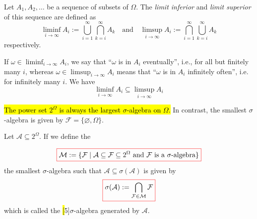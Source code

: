 \begin{definition}\label{def:liminf-limsup-sets}
Let $A_1,A_2,\dots$ be a sequence of subsets of $\Omega$.
The \emph{limit inferior} and \emph{limit superior} of this sequence are defined as
\[
  \liminf_{i\to\infty} A_i := \bigcup_{i=1}^{\infty} \bigcap_{k=i}^{\infty} A_k
\quad\text{and}\quad
  \limsup_{i\to\infty} A_i := \bigcap_{i=1}^{\infty} \bigcup_{k=i}^{\infty} A_k
\]
respectively.
\end{definition}

If $\omega \in \liminf_{i\to\infty} A_i$, we say that ``$\omega$ is in $A_i$ eventually'', i.e., for all but finitely many $i$, whereas $\omega \in \limsup_{i\to\infty} A_i$ means that ``$\omega$ is in $A_i$ infinitely often'', i.e. for infinitely many $i$.
We have
\begin{equation}\label{eq:liminf-is-subset-of-limsup}
  \liminf_{i\to\infty} A_i \subseteq \limsup_{i\to\infty} A_i
\end{equation}

\hl{The power set $2^\Omega$ is always the largest $\sigma$-algebra on $\Omega$.}
In contrast, the smallest $\sigma$-algebra is given by $\mathcal{F} = \{\varnothing,\Omega\}$.

\tikzexternaldisable
\begin{theorem}\label{thm:generated-sigma-algebra}
Let $\mathcal{A}\subseteq 2^\Omega$.
If we define the 
\[
{\color{red}\boxed{\color{black}
\mathcal{M} := \{\mathcal{F} \mid \mathcal{A} \subseteq \mathcal{F} \subseteq 2^\Omega\ \text{and}\ \mathcal{F}\ \text{is a }\sigma\text{-algebra}\}
}}
\]
the smallest $\sigma$-algebra such that $\mathcal{A} \subseteq \sigma(\mathcal{A})$ is given by
\[
{\color{red}\boxed{\color{black}
  \sigma(\mathcal{A}) := \bigcap_{\mathcal{F} \in \mathcal{M}} \mathcal{F}
}}
\]
which is called the \hl[5]{$\sigma$-algebra generated by $\mathcal{A}$}.
\end{theorem}
\tikzexternalenable

